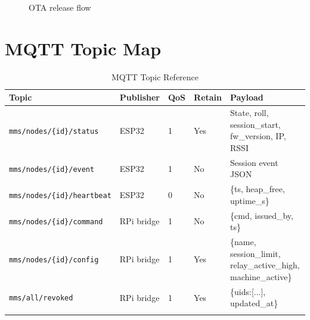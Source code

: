 \begin{figure}[H]
\centering
{}
\caption{OTA release flow}
\label{fig:ota_flow}
\end{figure}

\section{MQTT Topic Map}

\begin{longtable}{L{5cm}L{2.5cm}C{1.5cm}C{1.5cm}L{4.5cm}}
\toprule
\textbf{Topic} & \textbf{Publisher} & \textbf{QoS} & \textbf{Retain} & \textbf{Payload} \\
\midrule
\endhead
\texttt{mms/nodes/\{id\}/status} & ESP32 & 1 & Yes & State, roll, session\_start, fw\_version, IP, RSSI \\
\texttt{mms/nodes/\{id\}/event} & ESP32 & 1 & No & Session event JSON \\
\texttt{mms/nodes/\{id\}/heartbeat} & ESP32 & 0 & No & \{ts, heap\_free, uptime\_s\} \\
\texttt{mms/nodes/\{id\}/command} & RPi bridge & 1 & No & \{cmd, issued\_by, ts\} \\
\texttt{mms/nodes/\{id\}/config} & RPi bridge & 1 & Yes & \{name, session\_limit, relay\_active\_high, machine\_active\} \\
\texttt{mms/all/revoked} & RPi bridge & 1 & Yes & \{uids:[...], updated\_at\} \\
\bottomrule
\caption{MQTT Topic Reference}
\label{tab:mqtt_topics}
\end{longtable}


